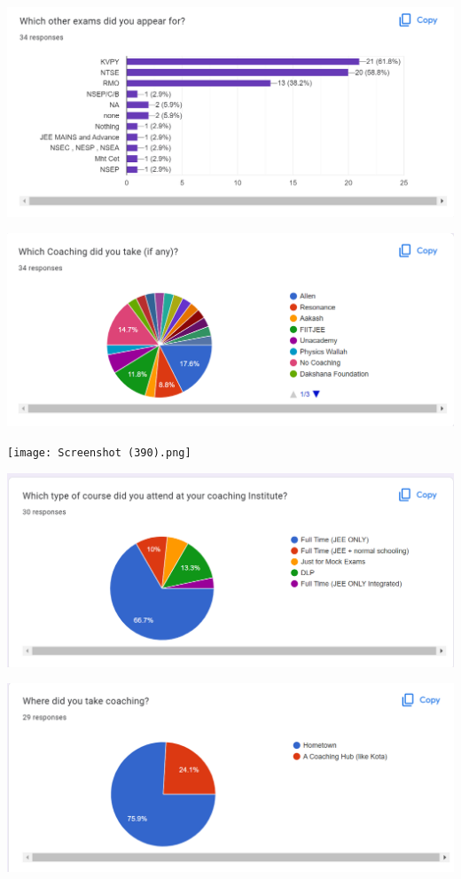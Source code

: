 \documentclass[
  letterpaper,
  DIV=11,
  numbers=noendperiod]{scrartcl}
\begin{document}
\includegraphics{Screenshot (381).png}

\includegraphics{Screenshot (382).png}

\texttt{[image: Screenshot (390).png]}

\includegraphics{Screenshot (383).png}

\includegraphics{Screenshot (384).png}
\end{document}
